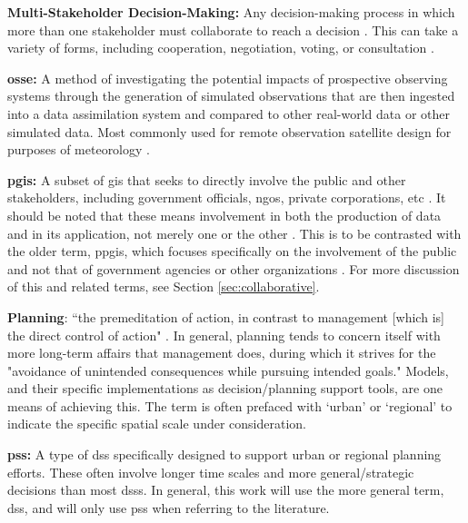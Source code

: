 \textbf{Multi-Stakeholder Decision-Making:} Any decision-making process in which more than one stakeholder must collaborate to reach a decision \cite{fitzgeraldRecommendationsFramingMultistakeholder2016}. This can take a variety of forms, including cooperation, negotiation, voting, or consultation \cite{garberMultiStakeholderTradeSpace2015}.

\textbf{\acf{osse}:} A method of investigating the potential impacts of prospective observing systems through the generation of simulated observations that are then ingested into a data assimilation system and compared to other real-world data or other simulated data. Most commonly used for remote observation satellite design for purposes of meteorology \cite{masutaniObservingSystemSimulation2010} .


\textbf{\acf{pgis}:} A subset of \ac{gis} that seeks to directly involve the public and other stakeholders, including government officials, \acp{ngo}, private corporations, etc \cite{sieberPublicParticipationGeographic2006}. It should be noted that these means involvement in both the production of data and in its application, not merely one or the other \cite{weinerParticipatoryGeographicInformation2007, talenBottomUpGIS2000}. This is to be contrasted with the older term, \ac{ppgis}, which focuses specifically on the involvement of the public and not that of government agencies or other organizations \cite{sieberPublicParticipationGeographic2006}. For more discussion of this and related terms, see Section \ref{sec:collaborative}.

\textbf{Planning}: ``the premeditation of action, in contrast to management [which is] the direct control of action" \cite{harrisLocationalModelsGeographic1993}. In general, planning tends to concern itself with more long-term affairs that management does, during which it strives for the "avoidance of unintended consequences while pursuing intended goals." Models, and their specific implementations as decision/planning support tools, are one means of achieving this. The term is often prefaced with `urban' or `regional' to indicate the specific spatial scale under consideration.

\textbf{\acf{pss}:} A type of \ac{dss} specifically designed to support urban or regional planning efforts. These often involve longer time scales and more general/strategic decisions than most \acp{dss}. In general, this work will use the more general term, \ac{dss}, and will only use \ac{pss} when referring to the literature.

